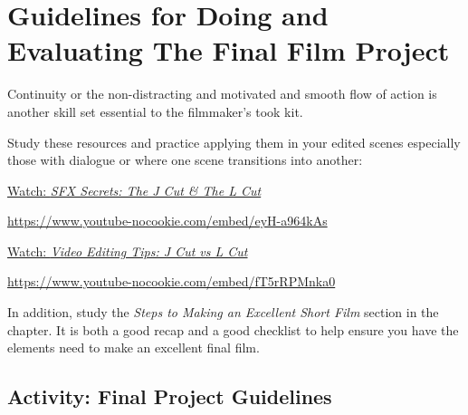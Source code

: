 \documentclass[
  letterpaper,
  DIV=11,
  numbers=noendperiod]{scrreprt}
\begin{document}
\section{Guidelines for Doing and Evaluating The Final Film
Project}\label{guidelines-for-doing-and-evaluating-the-final-film-project}

Continuity or the non-distracting and motivated and smooth flow of
action is another skill set essential to the filmmaker's took kit.

Study these resources and practice applying them in your edited scenes
especially those with dialogue or where one scene transitions into
another:

\href{https://www.youtube.com/watch?v=eyH-a964kAs}{Watch: \emph{SFX
Secrets: The J Cut \& The L Cut}}

\url{https://www.youtube-nocookie.com/embed/eyH-a964kAs}

\href{https://www.youtube.com/watch?v=fT5rRPMnka0}{Watch: \emph{Video
Editing Tips: J Cut vs L Cut}}

\url{https://www.youtube-nocookie.com/embed/fT5rRPMnka0}

In addition, study the \emph{Steps to Making an Excellent Short Film}
section in the chapter. It is both a good recap and a good checklist to
help ensure you have the elements need to make an excellent final film.

\subsection{Activity: Final Project
Guidelines}\label{activity-final-project-guidelines}
\end{document}
